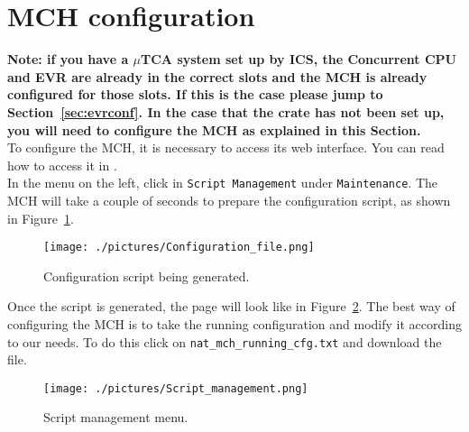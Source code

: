\documentclass[11pt
  , a4paper
  , article
  , oneside
  , showtrims
]{memoir}
\begin{document}
\section{MCH configuration}
\textbf{Note: if you have a $\mu$TCA system set up by ICS, the Concurrent CPU and EVR are already in the correct slots and the MCH is already configured for those slots. If this is the case please jump to Section~\ref{sec:evrconf}. In the case that the crate has not been set up, you will need to configure the MCH as explained in this Section.}\\

To configure the MCH, it is necessary to access its web interface. You can read how to access it in \citep{NATMCHWEBINTERFACE}.\\

In the menu on the left, click in \texttt{Script Management} under \texttt{Maintenance}. The MCH will take a couple of seconds to prepare the configuration script, as shown in Figure~\ref{fig:configfile}.\\

\begin{figure}[!htb]
  \centering
  \texttt{[image: ./pictures/Configuration\_file.png]}
  \caption{Configuration script being generated.}
  \label{fig:configfile}
\end{figure}

Once the script is generated, the page will look like in Figure~\ref{fig:scriptmanagement}. The best way of configuring the MCH is to take the running configuration and modify it according to our needs. To do this click on \texttt{nat\_mch\_running\_cfg.txt} and download the file.\\

\begin{figure}[!htb]
  \centering
  \texttt{[image: ./pictures/Script\_management.png]}
  \caption{Script management menu.}
  \label{fig:scriptmanagement}
\end{figure}
\end{document}
